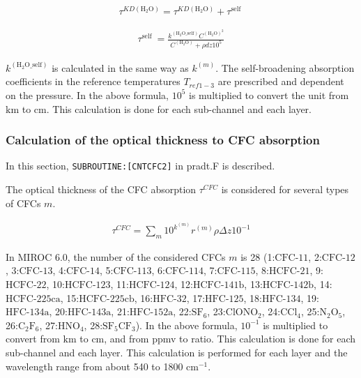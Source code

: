 \begin{eqnarray}
\tau^{K D\left(\mathrm{H_2O}\right)}=\tau^{K D\left(\mathrm{H_2O}\right)}+\tau^{\text {self }}
\end{eqnarray}

\begin{eqnarray}
\tau^{\text {self }}=\frac{k^{\left(\mathrm{H_2O\_self}\right)} C^{\left(\mathrm{H_2O}\right)^{2}}}{C^{\left(\mathrm{H_2O}\right)}+\rho d z 10^{5}}
\end{eqnarray}

\(k^{(\mathrm{H_2O\_self})}\) is calculated in the same way as
\(k^{(m)}\). The self-broadening absorption coefficients in the
reference temperatures \(T_{ref1-3}\) are prescribed and dependent on
the pressure. In the above formula, \(10^{5}\) is multiplied to convert
the unit from \(\mathrm{km}\) to \(\mathrm{cm}\). This calculation is
done for each sub-channel and each layer.

\hypertarget{calculation-of-the-optical-thickness-to-cfc-absorption}{%
\subsubsection{Calculation of the optical thickness to CFC
absorption}\label{calculation-of-the-optical-thickness-to-cfc-absorption}}

In this section, \texttt{SUBROUTINE:{[}CNTCFC2{]}} in pradt.F is
described.

The optical thickness of the CFC absorption \(\tau^{CFC}\) is considered
for several types of CFCs \(m\).

\begin{eqnarray}
\tau^{C F C}=\sum_{m} 10^{k^{(m)}} r^{(m)} \rho \Delta z 10^{-1}
\end{eqnarray}

In MIROC 6.0, the number of the considered CFCs \(m\) is 28
(1:\(\mathrm{CFC\text{-11}}\), 2:\(\mathrm{CFC\text{-12}}\),
3:\(\mathrm{CFC\text{-13}}\), 4:\(\mathrm{CFC\text{-14}}\),
5:\(\mathrm{CFC\text{-113}}\), 6:\(\mathrm{CFC\text{-114}}\),
7:\(\mathrm{CFC\text{-115}}\), 8:\(\mathrm{HCFC\text{-21}}\),
9:\(\mathrm{HCFC\text{-22}}\), 10:\(\mathrm{HCFC\text{-123}}\),
11:\(\mathrm{HCFC\text{-124}}\), 12:\(\mathrm{HCFC\text{-141b}}\),
13:\(\mathrm{HCFC\text{-142b}}\), 14:\(\mathrm{HCFC\text{-225ca}}\),
15:\(\mathrm{HCFC\text{-225cb}}\), 16:\(\mathrm{HFC\text{-32}}\),
17:\(\mathrm{HFC\text{-125}}\), 18:\(\mathrm{HFC\text{-134}}\),
19:\(\mathrm{HFC\text{-134a}}\), 20:\(\mathrm{HFC\text{-143a}}\),
21:\(\mathrm{HFC\text{-152a}}\), 22:\(\mathrm{SF_6}\),
23:\(\mathrm{ClONO_2}\), 24:\(\mathrm{CCl_4}\), 25:\(\mathrm{N_2O_5}\),
26:\(\mathrm{C_2F_6}\), 27:\(\mathrm{HNO_4}\),
28:\(\mathrm{SF_5CF_3}\)). In the above formula, \(10^{-1}\) is
multiplied to convert from \(\mathrm{km}\) to \(\mathrm{cm}\), and from
ppmv to ratio. This calculation is done for each sub-channel and each
layer. This calculation is performed for each layer and the wavelength
range from about 540 to 1800 \(\mathrm{cm}^{-1}\).

